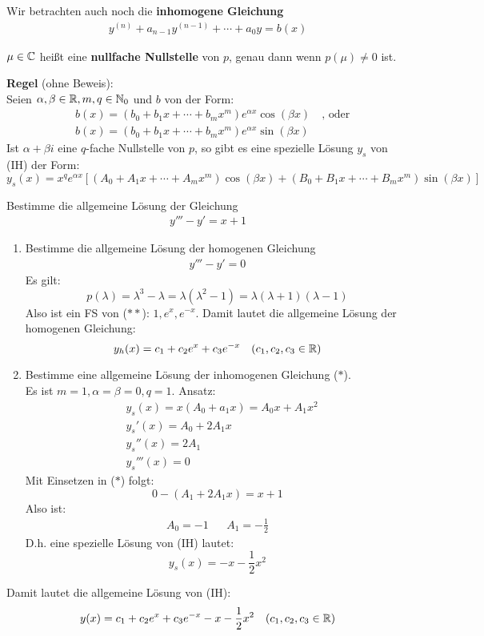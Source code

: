 \documentclass[a4paper,twoside,DIV15,BCOR12mm,chapterprefix=true,headings=twolinechapter]{scrbook}
\begin{document}
Wir betrachten auch noch die \textbf{inhomogene Gleichung}
\begin{align*}
\tag{IH} y^{(n)}+a_{n-1}y^{(n-1)}+\cdots+a_0y=b(x)
\end{align*}

\begin{definition}
$\mu\in\mathbb{C}$ heißt eine \textbf{nullfache Nullstelle} von $p$, genau dann wenn
$p(\mu)\ne 0$ ist.
\end{definition}

\textbf{Regel} (ohne Beweis):\\
Seien $\alpha,\beta\in\mathbb{R},m,q\in\mathbb{N}_0$ und $b$ von der Form:
\begin{align*}
&b(x)=(b_0+b_1x+\cdots+b_mx^m)e^{\alpha x}\cos(\beta x)\quad\text{, oder}\\
&b(x)=(b_0+b_1x+\cdots+b_mx^m)e^{\alpha x}\sin(\beta x)
\end{align*}
Ist $\alpha+\beta i$ eine $q$-fache Nullstelle von $p$, so gibt es eine spezielle Lösung
$y_s$ von (IH) der Form:
\[y_s(x)=x^qe^{\alpha x}\left[(A_0+A_1x+\cdots+A_mx^m)\cos(\beta x)+(B_0+B_1x+\cdots+B_mx^m)\sin(\beta x)\right]\]

\begin{beispiel}
Bestimme die allgemeine Lösung der Gleichung
\begin{align*}
y'''-y'=x+1\tag{$*$}
\end{align*}
\begin{enumerate}
\item Bestimme die allgemeine Lösung der homogenen Gleichung
\begin{align*}
y'''-y'=0\tag{$**$}
\end{align*}
Es gilt:
\[p(\lambda)=\lambda^3-\lambda=\lambda(\lambda^2-1)=\lambda(\lambda+1)(\lambda-1)\]
Also ist ein FS von ($**$): $1,e^x,e^{-x}$. Damit lautet die allgemeine Lösung der homogenen
Gleichung:
\[y_h(x)=c_1+c_2e^x+c_3e^{-x}\quad(c_1,c_2,c_3\in\mathbb{R})\]
\item Bestimme eine allgemeine Lösung der inhomogenen Gleichung ($*$).\\ 
Es ist $m=1,\alpha=\beta=0,q=1$. Ansatz:
\begin{align*}
&y_s(x)=x(A_0+a_1x)=A_0x+A_1x^2\\
&y_s'(x)=A_0+2A_1x\\
&y_s''(x)=2A_1\\
&y_s'''(x)=0
\end{align*}
Mit Einsetzen in ($*$) folgt:
\[0-(A_1+2A_1x)=x+1\]
Also ist:
\begin{align*}
A_0=-1&&A_1=-\frac12
\end{align*}
D.h. eine spezielle Lösung von (IH) lautet:
\[y_s(x)=-x-\frac12 x^2\]
\end{enumerate}
Damit lautet die allgemeine Lösung von (IH):
\[y(x)=c_1+c_2e^x+c_3e^{-x}-x-\frac12 x^2\quad(c_1,c_2,c_3\in\mathbb{R})\]
\end{beispiel}
\end{document}
